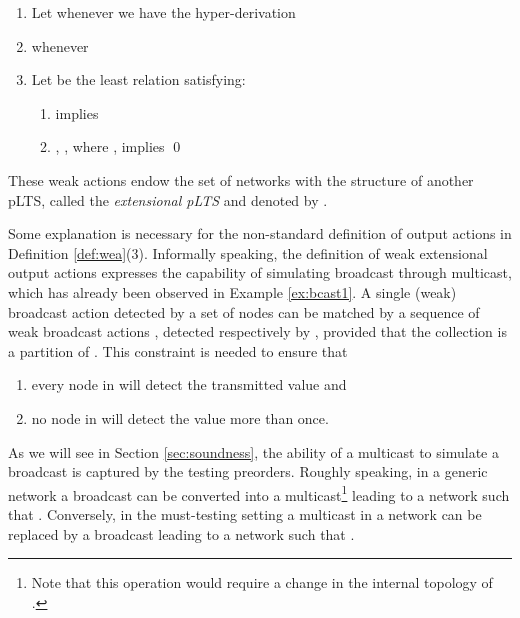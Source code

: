 \documentclass{LMCS}
\begin{document}
\begin{defi}\label{def:wea}
  \begin{enumerate}\item Let  whenever we have the hyper-derivation 
        

  \item   whenever  

  \item Let  be the least relation satisfying:
    \begin{enumerate}[label=(\alph*)]
    \item  implies 

   \item  ,  , where 
            , implies 
               \qed
    \end{enumerate}
  \end{enumerate}
\end{defi}
\noindent
These weak actions endow the set of networks \nets with the structure
of another pLTS, called the \emph{extensional pLTS} and denoted by
. 



Some explanation is necessary for the non-standard definition of
output actions in Definition \ref{def:wea}(3).  Informally speaking, the definition of
weak extensional output actions expresses the capability of simulating
broadcast through multicast, which has already been observed 
in Example \ref{ex:bcast1}. A single (weak) broadcast action
detected by a set of nodes  can be matched by a sequence of weak
broadcast actions , detected
respectively by , provided that
the collection  is a partition of
. This constraint is needed to ensure that
\begin{enumerate}[label=(\roman*)]
\item every node in  will detect the transmitted value and
\item no node in  will detect the value more than once.
\end{enumerate}
As we will see in Section \ref{sec:soundness}, the ability of a multicast to 
simulate a broadcast is captured by the testing preorders. Roughly speaking, 
in a generic network  a broadcast can be converted into a multicast\footnote{
Note that this operation would require a change in the internal topology of .} 
leading to a network  such that . 
Conversely, in the must-testing setting a multicast in a network  
can be replaced by a broadcast leading to a network  such that 
.
\end{document}
